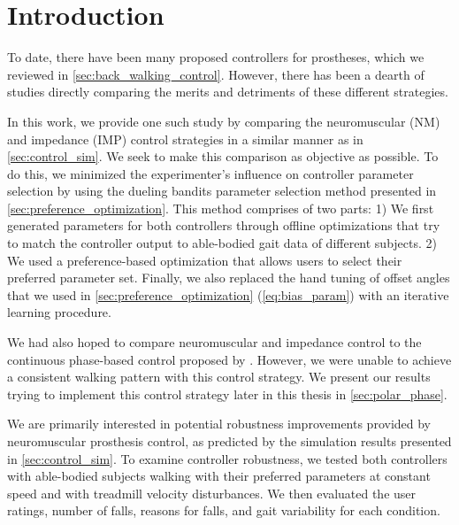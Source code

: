 \section{Introduction}

To date, there have been many proposed controllers for prostheses, which we
reviewed in \cref{sec:back_walking_control}. However, there has been a dearth of
studies directly comparing the merits and detriments of these different
strategies. 

In this work, we provide one such study by comparing the neuromuscular (NM) and
impedance (IMP) control strategies in a similar manner as in
\cref{sec:control_sim}.  We seek to make this comparison as objective as
possible. To do this, we minimized the experimenter's influence on controller
parameter selection by using the dueling bandits parameter selection method
presented in \cref{sec:preference_optimization}. This method comprises of two
parts: 1) We first generated parameters for both controllers through offline
optimizations that try to match the controller output to able-bodied gait data
of different subjects. 2) We used a preference-based optimization that allows
users to select their preferred parameter set. Finally, we also replaced the
hand tuning of offset angles that we used in \cref{sec:preference_optimization}
(\cref{eq:bias_param}) with an iterative learning procedure.

We had also hoped to compare neuromuscular and impedance control to the
continuous phase-based control proposed by \citet{quintero2016preliminary}.
However, we were unable to achieve a consistent walking pattern with this
control strategy. We present our results trying to implement this control
strategy later in this thesis in \cref{sec:polar_phase}.

We are primarily interested in potential robustness improvements provided by
neuromuscular prosthesis control, as predicted by the simulation results
presented in \cref{sec:control_sim}. To examine controller robustness, we tested
both controllers with able-bodied subjects walking with their preferred
parameters at constant speed and with treadmill velocity disturbances. We then
evaluated the user ratings, number of falls, reasons for falls, and gait
variability for each condition. 
